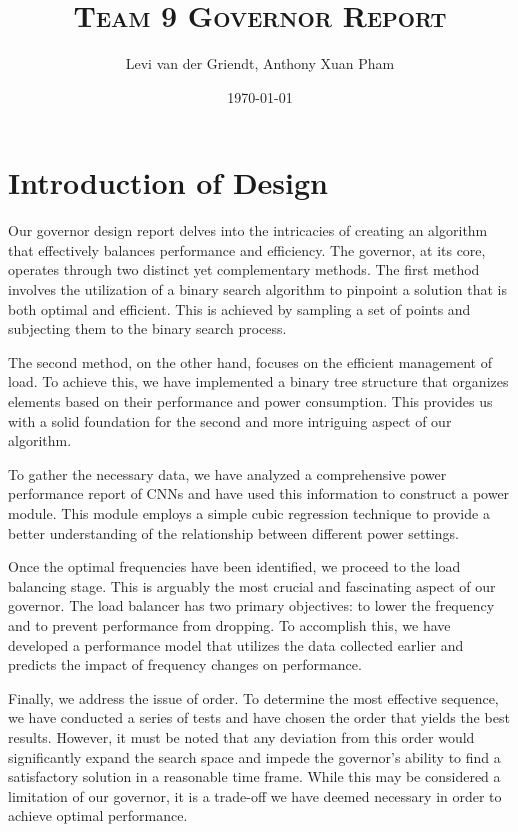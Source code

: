\documentclass[a4paper, 12pt, fleqn]{article}
\title{\textsc{Team 9 Governor Report}}
\author {Levi van der Griendt, Anthony Xuan Pham}
\date{\today}
\begin{document}
 \maketitle

\section{Introduction of Design}
Our governor design report delves into the intricacies of creating an algorithm that effectively balances performance and efficiency. The governor, at its core, operates through two distinct yet complementary methods. The first method involves the utilization of a binary search algorithm to pinpoint a solution that is both optimal and efficient. This is achieved by sampling a set of points and subjecting them to the binary search process.

The second method, on the other hand, focuses on the efficient management of load. To achieve this, we have implemented a binary tree structure that organizes elements based on their performance and power consumption. This provides us with a solid foundation for the second and more intriguing aspect of our algorithm.

To gather the necessary data, we have analyzed a comprehensive power performance report of CNNs and have used this information to construct a power module. This module employs a simple cubic regression technique to provide a better understanding of the relationship between different power settings.

Once the optimal frequencies have been identified, we proceed to the load balancing stage. This is arguably the most crucial and fascinating aspect of our governor. The load balancer has two primary objectives: to lower the frequency and to prevent performance from dropping. To accomplish this, we have developed a performance model that utilizes the data collected earlier and predicts the impact of frequency changes on performance.

Finally, we address the issue of order. To determine the most effective sequence, we have conducted a series of tests and have chosen the order that yields the best results. However, it must be noted that any deviation from this order would significantly expand the search space and impede the governor's ability to find a satisfactory solution in a reasonable time frame. While this may be considered a limitation of our governor, it is a trade-off we have deemed necessary in order to achieve optimal performance.
\end{document}

